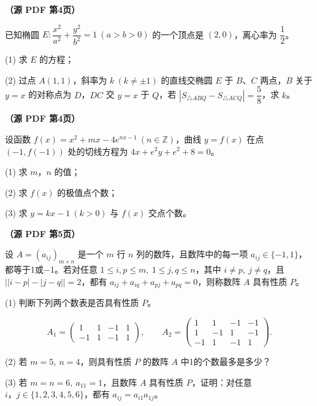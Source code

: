 \begin{question}
\textbf{（源 PDF 第4页）} 

已知椭圆 \(E:\dfrac{x^2}{a^2}+\dfrac{y^2}{b^2}=1\ (a>b>0)\) 的一个顶点是 \((2,0)\)，离心率为 \(\dfrac{1}{2}\)。

(1) 求 \(E\) 的方程；

(2) 过点 \(A(1,1)\)，斜率为 \(k\ (k\ne\pm1)\) 的直线交椭圆 \(E\) 于 \(B\text{、}C\) 两点，\(B\) 关于 \(y=x\) 的对称点为 \(D\)，\(DC\) 交 \(y=x\) 于 \(Q\)，若 \(\left\lvert S_{\triangle ABQ}-S_{\triangle ACQ}\right\rvert=\dfrac{5}{8}\)，求 \(k\)。

\end{question}
\begin{question}
\textbf{（源 PDF 第4页）} 

设函数 \(f(x)=x^2+mx-4e^{nx-1}\ (n\in\mathbb{Z})\)，曲线 \(y=f(x)\) 在点 \((-1,f(-1))\) 处的切线方程为 \(4x+e^2y+e^2+8=0\)。

(1) 求 \(m\text{，}n\) 的值；

(2) 求 \(f(x)\) 的极值点个数；

(3) 求 \(y=kx-1\ (k>0)\) 与 \(f(x)\) 交点个数。

\end{question}
\begin{question}
\textbf{（源 PDF 第5页）} 

设 \(A=(a_{ij})_{m\times n}\) 是一个 \(m\) 行 \(n\) 列的数阵，且数阵中的每一项 \(a_{ij}\in\{-1,1\}\)，都等于1或$-$1。若对任意 \(1\leq i,p\leq m,\ 1\leq j,q\leq n\)，其中 \(i\ne p,\ j\ne q\)，且 \(\bigl\lvert\lvert i-p\rvert-\lvert j-q\rvert\bigr\rvert=2\)，都有 \(a_{ij}+a_{iq}+a_{pj}+a_{pq}=0\)，则称数阵 \(A\) 具有性质 \(P\)。

(1) 判断下列两个数表是否具有性质 \(P\)。

\nopagebreak[4]
\[
A_1=
\begin{pmatrix}
1&1&-1&1\\
-1&1&-1&1
\end{pmatrix},
\qquad
A_2=
\begin{pmatrix}
1&1&-1&-1\\
1&-1&1&-1\\
-1&1&-1&1
\end{pmatrix}.
\]

(2) 若 \(m=5,\ n=4\)，则具有性质 \(P\) 的数阵 \(A\) 中1的个数最多是多少？

(3) 若 \(m=n=6,\ a_{11}=1\)，且数阵 \(A\) 具有性质 \(P\)，证明：对任意 \(i\text{，}j\in\{1,2,3,4,5,6\}\)，都有 \(a_{ij}=a_{i1}a_{1j}\)。

\end{question}